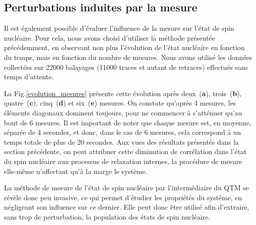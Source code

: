 \subsection{Perturbations induites par la mesure}
Il est également possible d'évaluer l'influence de la mesure sur l'état de spin nucléaire. Pour cela, nous avons choisi d'utiliser la méthode présentée précédemment, en observant non plus l'évolution de l'état nucléaire en fonction du temps, mais en fonction du nombre de mesures. Nous avons utilisé les données collectées sur 22000 balayages (11000 traces et autant de retraces) effectués sans temps d'attente.

La Fig.\ref{evolution_mesures} présente cette évolution après deux~(\textbf{a}), trois~(\textbf{b}), quatre~(\textbf{c}), cinq~(\textbf{d}) et six~(\textbf{e}) mesures. On constate qu'après 4 mesures, les éléments diagonaux dominent toujours, pour ne commencer à s'atténuer qu'au bout de 6 mesures. Il est important de noter que chaque mesure est, en moyenne, séparée de 4 secondes, et donc, dans le cas de 6 mesures, cela correspond à un temps totale de plus de 20 secondes. Aux vues des résultats présentés dans la section précédente, on peut attribuer cette diminution de corrélation dans l'état du spin nucléaire aux processus de relaxation internes, la procédure de mesure elle-même n'affectant qu'à la marge le système. 

La méthode de mesure de l'état de spin nucléaire par l'intermédiaire du QTM se révèle donc peu invasive, ce qui permet d'étudier les propriétés du système, en négligeant son influence sur ce dernier. Elle peut donc être utilisé afin d'extraire, sans trop de perturbation, la population des états de spin nucléaire.

